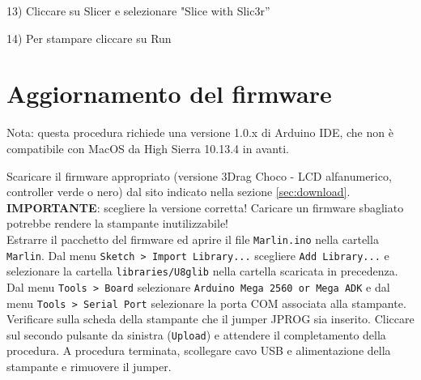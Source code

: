 \documentclass[12pt]{article}
\begin{document}
13) Cliccare su Slicer e selezionare "Slice with Slic3r”

14) Per stampare cliccare su Run


\section{Aggiornamento del firmware}

	Nota: questa procedura richiede una versione 1.0.x di Arduino IDE, che non è compatibile con MacOS da High Sierra 10.13.4 in avanti.

	Scaricare il firmware appropriato (versione 3Drag Choco - LCD alfanumerico, controller verde o nero) dal sito indicato nella sezione \ref{sec:download}.\\
	
	\textbf{IMPORTANTE}: scegliere la versione corretta! Caricare un firmware sbagliato potrebbe rendere la stampante inutilizzabile!\\
	
	Estrarre il pacchetto del firmware ed aprire il file \texttt{Marlin.ino} nella cartella \texttt{Marlin}. Dal menu \texttt{Sketch > Import Library...} scegliere \texttt{Add Library...} e selezionare la cartella	 \texttt{libraries/U8glib} nella cartella scaricata in precedenza.
	Dal menu \texttt{Tools > Board} selezionare \texttt{Arduino Mega 2560 or Mega ADK} e dal menu \texttt{Tools > Serial Port} selezionare la porta COM associata alla stampante. Verificare sulla scheda della stampante che il jumper JPROG sia inserito. Cliccare sul secondo pulsante da sinistra (\texttt{Upload}) e attendere il completamento della procedura. 
	A procedura terminata, scollegare cavo USB e alimentazione della stampante e rimuovere il jumper.
\end{document}
